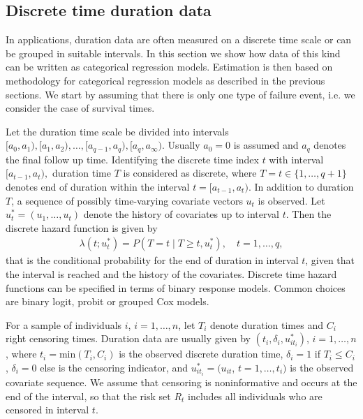 \documentclass[11pt,a4paper,twoside]{bayesxarticle}
\begin{document}
\subsection{Discrete time duration data}
\label{discretetime}

In applications, duration data are often measured on a discrete time
scale or can be grouped in suitable intervals. In this section we
show how data of this kind can be written as categorical regression
models. Estimation is then based on methodology for categorical
regression models as described in the previous sections. We start by
assuming that there is only one type of failure event, i.e. we
consider the case of survival times.

Let the duration time scale be divided into intervals $\lbrack
a_{0},a_{1}),\lbrack a_{1},a_{2}),\ldots, \lbrack a_{q-1},a_{q}),
\lbrack a_{q},a_{\infty}).$ Usually $a_{0}=0$ is assumed and $a_{q}$
denotes the final follow up time. Identifying the discrete time
index $t$ with interval $\lbrack a_{t-1},a_{t}),$ duration time $T$
is considered as discrete, where $T=t\in \{1,\ldots,q+1\}$ denotes
end of duration within the interval $t=\lbrack a_{t-1},a_{t}).$ In
addition to duration $T$, a sequence of possibly time-varying
covariate vectors $u_t$ is observed. Let
$u_t^*=(u_{1},\ldots,u_{t})$ denote the history of covariates up to
interval $t$. Then the discrete hazard function is given by
\begin{eqnarray*}
\lambda(t;u_t^*)=P(T=t\mid T \geq t,u_t^*), \quad t=1,\ldots,q,
\end{eqnarray*}
that is the conditional probability for the end of duration in
interval $t$, given that the interval is reached and the history of
the covariates. Discrete time hazard functions can be specified in
terms of binary response models. Common choices are binary logit,
probit or grouped Cox models.

For a sample of individuals $i$, $i=1,\ldots,n$, let $T_{i}$ denote
duration times and $C_{i}$ right censoring times. Duration data are
usually given by $(t_{i},\delta_{i},u_{it_{i}}^*)$, $i =
1,\ldots,n$, where $t_{i}=\mbox{min}(T_{i},C_{i})$ is the observed
discrete duration time, $\delta_{i}=1$ if $T_{i}\le C_{i}$,
$\delta_{i}=0$ else is the censoring indicator, and
$u_{it_{i}}^*=(u_{it}$, $t=1,\ldots,t_{i})$ is the observed
covariate sequence. We assume that censoring is noninformative and
occurs at the end of the interval, so that the risk set $R_{t}$
includes all individuals who are censored in interval $t$.
\end{document}
